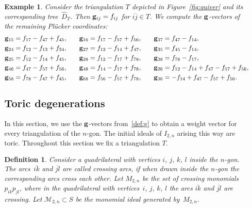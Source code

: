 \documentclass[10pt,a4paper]{amsart}
\newcommand{\thlabel}[1]{\label{#1}}
\newcommand{\thref}[1]{\ref{#1}}
\newtheorem{Definition}[Theorem]{Definition}
\newtheorem{Example}[Theorem]{Example}
\numberwithin{equation}{section}
\begin{document}
\begin{Example}
Consider the triangulation $T$ depicted in Figure~\ref{fig:quiver} and its corresponding tree~$\widehat{D}_T$.
Then ${\bf g}_{ij}=f_{ij}$ for $\overline{ij}\in T$. We compute the ${\bf g}$-vectors of the remaining Pl\"ucker coordinates:
\begin{displaymath}
 \begin{split}
 {\bf g}_{15} & = f_{17}-f_{47}+f_{45},\\
 {\bf g}_{24} & = f_{12}-f_{13}+f_{34},\\
 {\bf g}_{25} & = f_{12}-f_{14}+f_{45},\\
 {\bf g}_{46} & =f_{47}-f_{57}+f_{56},\\
 {\bf g}_{58} & = f_{78} -f_{47} +f_{45},\\
 \end{split}
\quad\quad
 \begin{split}
 {\bf g}_{16} & = f_{17}-f_{57}+f_{56},\\
 {\bf g}_{27} & = f_{12}-f_{14}+f_{47},\\
 {\bf g}_{28} & = f_{12}-f_{17}+f_{78},\\
 {\bf g}_{48} & = f_{14}-f_{17}+f_{78},\\
 {\bf g}_{68} & = f_{56}-f_{57}+f_{78},\\
 \end{split}
 \quad\quad
 \begin{split}
{\bf g}_{37} & = f_{47}-f_{14},\\
{\bf g}_{35} & = f_{45}-f_{14},\\
{\bf g}_{38} & = f_{78}-f_{17},\\
{\bf g}_{26} & = f_{12}-f_{14}+f_{47}-f_{57}+f_{56},\\
{\bf g}_{36} & = -f_{14}+f_{47}-f_{57}+f_{56}.\\
\end{split}
\end{displaymath}
\end{Example}


\subsection{Toric degenerations}\label{sec: toric deg}
In this section, we use the ${\bf g}$-vectors from~\thref{def:g} to obtain a weight vector for every triangulation of the $n$-gon.
The initial ideals of $I_{2,n}$ arising this way are toric.
Throughout this section we fix a triangulation $T$.

\begin{Definition}\thlabel{def:monomial ideal}
Consider a quadrilateral with vertices $i$, $j$, $k$, $l$ inside the $n$-gon.
The arcs~$\overline{ik}$ and $\overline{jl}$ are called {\it crossing arcs}, if when drawn inside the $n$-gon the corresponding arcs cross each other.
Let $M_{2,n}$ be the set of {\it crossing monomials} $p_{ik}p_{jl}$, where in the quadrilateral with vertices~$i$, $j$, $k$, $l$ the arcs $\overline{ik}$ and $\overline{jl}$ are crossing.
Let $\mathcal M_{2,n}\subset S$ be the monomial ideal generated by~$M_{2,n}$.
\end{Definition}
\end{document}
